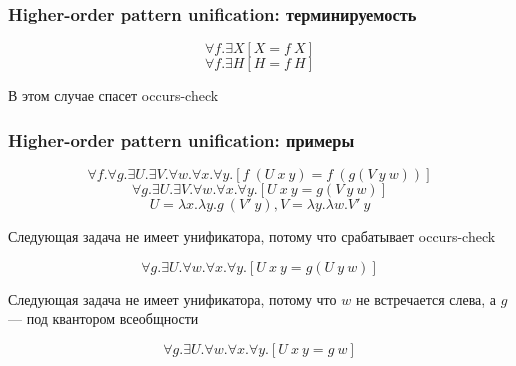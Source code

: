 \documentclass{beamer}
\begin{document}
\begin{frame}[fragile]
  \frametitle{Higher-order pattern unification: терминируемость}
  \[ \forall f. \exists X [X = f \ X] \]
  \[ \forall f. \exists H [H = f \ H] \]

  \begin{center}
    В этом случае спасет occurs-check
  \end{center}

\end{frame}

\begin{frame}[fragile]
  \frametitle{Higher-order pattern unification: примеры}
  \[\forall f. \forall g. \exists U. \exists V. \forall w. \forall x. \forall y. [f \ (U \ x \ y) = f \ (g (V \ y \ w))]\]
  \[\forall g. \exists U. \exists V. \forall w. \forall x. \forall y. [U \ x \ y = g (V \ y \ w)]\]
  \[U = \lambda x. \lambda y. g \ (V' \ y), V = \lambda y. \lambda w. V' \ y\]

  \begin{center}
    Следующая задача не имеет унификатора, потому что срабатывает occurs-check
  \end{center}
  \[\forall g. \exists U. \forall w. \forall x. \forall y. [U \ x \ y = g (U \ y \ w)]\]

  \begin{center}
    Следующая задача не имеет унификатора, потому что $w$ не встречается слева, а $g$ --- под квантором всеобщности
  \end{center}
  \[\forall g. \exists U. \forall w. \forall x. \forall y. [U \ x \ y = g \ w]\]
\end{frame}
\end{document}

